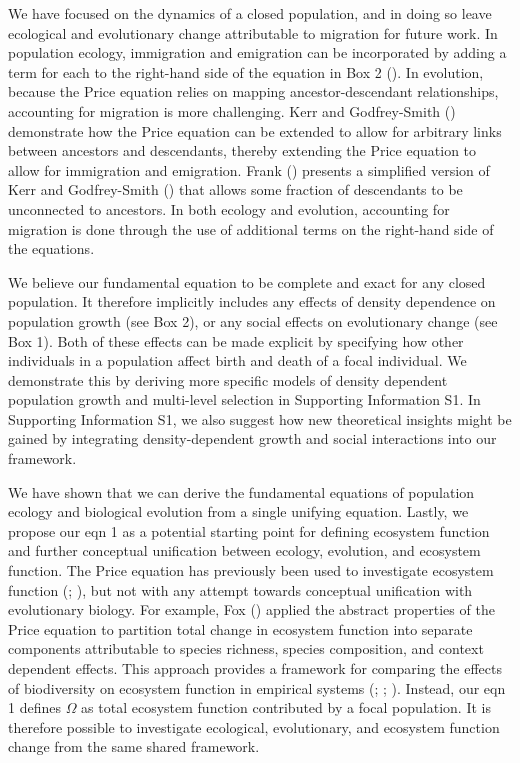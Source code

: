 \documentclass[
]{article}
\begin{document}
We have focused on the dynamics of a closed population, and in doing so
leave ecological and evolutionary change attributable to migration for
future work. In population ecology, immigration and emigration can be
incorporated by adding a term for each to the right-hand side of the
equation in Box 2 (). In
evolution, because the Price equation relies on mapping
ancestor-descendant relationships, accounting for migration is more
challenging. Kerr and Godfrey-Smith ()
demonstrate how the Price equation can be extended to allow for
arbitrary links between ancestors and descendants, thereby extending the
Price equation to allow for immigration and emigration. Frank
() presents a simplified version of Kerr
and Godfrey-Smith () that allows some
fraction of descendants to be unconnected to ancestors. In both ecology
and evolution, accounting for migration is done through the use of
additional terms on the right-hand side of the equations.

We believe our fundamental equation to be complete and exact for any
closed population. It therefore implicitly includes any effects of
density dependence on population growth (see Box 2), or any social
effects on evolutionary change (see Box 1). Both of these effects can be
made explicit by specifying how other individuals in a population affect
birth and death of a focal individual. We demonstrate this by deriving
more specific models of density dependent population growth and
multi-level selection in Supporting Information S1. In Supporting
Information S1, we also suggest how new theoretical insights might be
gained by integrating density-dependent growth and social interactions
into our framework.

We have shown that we can derive the fundamental equations of population
ecology and biological evolution from a single unifying equation.
Lastly, we propose our eqn 1 as a potential starting point for defining
ecosystem function and further conceptual unification between ecology,
evolution, and ecosystem function. The Price equation has previously
been used to investigate ecosystem function
(;
), but not with any attempt towards
conceptual unification with evolutionary biology. For example, Fox
() applied the abstract properties of the
Price equation to partition total change in ecosystem function into
separate components attributable to species richness, species
composition, and context dependent effects. This approach provides a
framework for comparing the effects of biodiversity on ecosystem
function in empirical systems (;
;
). Instead, our
eqn 1 defines \(\Omega\) as total ecosystem function contributed by a
focal population. It is therefore possible to investigate ecological,
evolutionary, and ecosystem function change from the same shared
framework.
\end{document}
